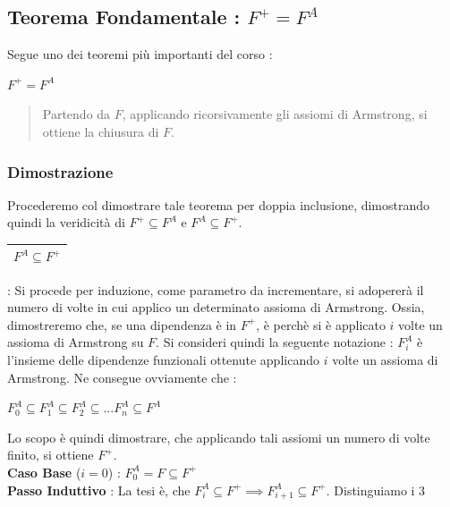 \documentclass[12pt, letterpaper]{article}
\begin{document}
\subsection{Teorema Fondamentale : \(F^+=F^A\)}
Segue uno dei teoremi più importanti del corso :\begin{center}
    \(F^+=F^A\)
\end{center}
\begin{quote}Partendo da \(F\), applicando ricorsivamente gli assiomi di Armstrong, si ottiene la chiusura di \(F\).\end{quote} \subsubsection{Dimostrazione}\label{dim}
Procederemo col dimostrare tale teorema per doppia inclusione, dimostrando quindi la veridicità di \(F^+\subseteq F^A\) e \(F^A\subseteq F^+\).
\\\begin{tabular}{|c|}\hline \(F^A\subseteq F^+\) \\ \hline\end{tabular}: Si procede per induzione, come parametro da 
incrementare, si adopererà il numero di volte in cui applico un determinato assioma di Armstrong. Ossia, dimostreremo che, 
se una dipendenza è in \(F^+\), è perchè si è applicato \(i\) volte un assioma di Armstrong su \(F\). Si consideri quindi 
la seguente notazione : \(F^A_i\) è l'insieme delle dipendenze funzionali ottenute applicando \(i\) volte un assioma di Armstrong.
Ne consegue ovviamente che : \begin{center}
    \(F^A_0\subseteq F^A_1\subseteq F^A_2\subseteq... F^A_n\subseteq F^A\)\end{center}
Lo scopo è quindi dimostrare, che applicando tali assiomi un numero di volte finito, si ottiene \(F^+\).\\
\textbf{Caso Base } (\(i=0\)) : \(F_0^A=F\subseteq F^+\) 
\\\textbf{Passo Induttivo } : La tesi è, che \(F_i^A\subseteq F^+\implies F_{i+1}^A\subseteq F^+\). Distinguiamo i 3 
\end{document}
